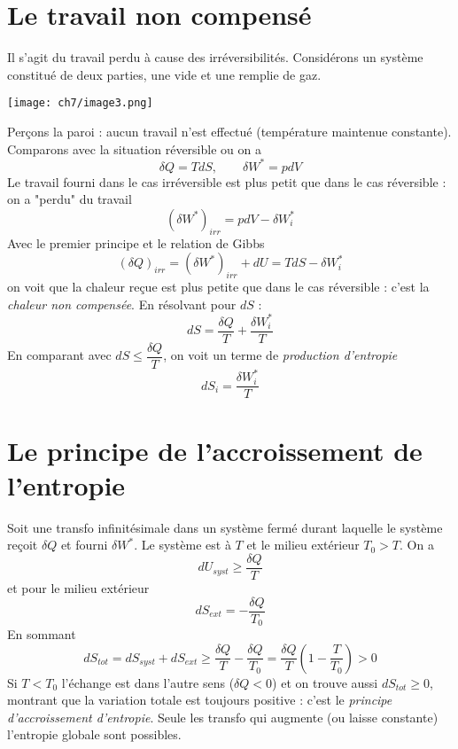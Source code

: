 	\section{Le travail non compensé}
	Il s'agit du travail perdu à cause des irréversibilités. Considérons un 
	système constitué de deux parties, une vide et une remplie de gaz. 
	\begin{center}
	\texttt{[image: ch7/image3.png]}
	\end{center}	
	Perçons 
	la paroi : aucun travail n'est effectué (température maintenue constante). 
	Comparons avec la situation réversible ou on a 
	\begin{equation}
	\delta Q = TdS,\qquad \delta W^* = pdV
	\end{equation}
	Le travail fourni dans le cas irréversible est plus petit que dans le cas 
	réversible : on a "perdu" du travail 
	\begin{equation}
	(\delta W^*)_{irr} = pdV - \delta W_i^*
	\end{equation}
	Avec le premier principe et le relation de Gibbs
	\begin{equation}
	(\delta Q)_{irr} = (\delta W^*)_{irr} + dU = TdS - \delta W_i^*
	\end{equation}
	on voit que la chaleur reçue est plus petite que dans le cas réversible : 
	c'est la \textit{chaleur non compensée}. En résolvant pour $dS$ :
	\begin{equation}
	dS = \dfrac{\delta Q}{T}+\dfrac{\delta W_i^*}{T}
	\end{equation}
	En comparant avec $dS \leq \dfrac{\delta Q}{T}$, on voit un terme de 
	\textit{production d'entropie}
	\begin{equation}
	dS_i = \dfrac{\delta W_i^*}{T}
	\end{equation}
	
	
	\section{Le principe de l’accroissement de l’entropie}
	Soit une transfo infinitésimale dans un système fermé durant laquelle le 
	système reçoit $\delta Q$ et fourni $\delta W^*$. Le système est à $T$ et 
	le milieu extérieur $T_0>T$. On a 
	\begin{equation}
	dU_{syst} \geq \dfrac{\delta Q}{T}
	\end{equation}
	et pour le milieu extérieur 
	\begin{equation}
	dS_{ext} = -\dfrac{\delta Q}{T_0}
	\end{equation}
	En sommant
	\begin{equation}
	dS_{tot} = dS_{syst} + dS_{ext} \geq \dfrac{\delta Q}{T}-\dfrac{\delta Q}{
	T_0} = \dfrac{\delta Q}{T}\left(1-\dfrac{T}{T_0}\right) > 0
	\end{equation}
	Si $T < T_0$ l'échange est dans l'autre sens ($\delta Q <0$) et on trouve 
	aussi $dS_{tot} \geq 0$, montrant que la variation totale est toujours 
	positive : c'est le \textit{principe d'accroissement d'entropie}. Seule les 
	transfo qui augmente (ou laisse constante) l'entropie globale sont possibles.\\
	

